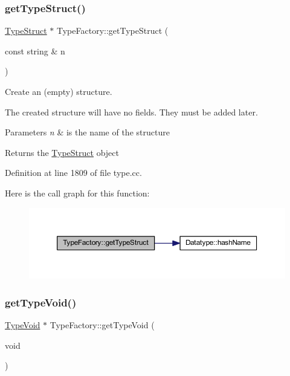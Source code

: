 \subsubsection{\texorpdfstring{getTypeStruct()}{getTypeStruct()}}
{\footnotesize\ttfamily \mbox{\hyperlink{class_type_struct}{Type\+Struct}} $\ast$ Type\+Factory\+::get\+Type\+Struct (\begin{DoxyParamCaption}\item[{const string \&}]{n }\end{DoxyParamCaption})}



Create an (empty) structure. 

The created structure will have no fields. They must be added later. 
\begin{DoxyParams}{Parameters}
{\em n} & is the name of the structure \\
\hline
\end{DoxyParams}
\begin{DoxyReturn}{Returns}
the \mbox{\hyperlink{class_type_struct}{Type\+Struct}} object 
\end{DoxyReturn}


Definition at line 1809 of file type.\+cc.

Here is the call graph for this function\+:
\nopagebreak
\begin{figure}[H]
\begin{center}
\leavevmode
\includegraphics[width=350pt]{class_type_factory_aaa4a75179b840571eeb97e24642c55ee_cgraph}
\end{center}
\end{figure}
\mbox{\label{class_type_factory_ab7277908ef32101f172633ec00fbecb1}} 
\subsubsection{\texorpdfstring{getTypeVoid()}{getTypeVoid()}}
{\footnotesize\ttfamily \mbox{\hyperlink{class_type_void}{Type\+Void}} $\ast$ Type\+Factory\+::get\+Type\+Void (\begin{DoxyParamCaption}\item[{void}]{ }\end{DoxyParamCaption})}



